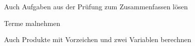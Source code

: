 \begin{kbaufgabe}{Auch Aufgaben aus der Prüfung zum Zusammenfassen lösen}
\begin{kbblock}
\item[]
\end{kbblock}
\end{kbaufgabe}


\begin{kbaufgabe}{Terme malnehmen}
\begin{kbblock}
\end{kbblock}
\begin{kbblock}
\end{kbblock}
\begin{kbblock}
\end{kbblock}
\begin{kbblock}
\end{kbblock}
\begin{kbblock}
\end{kbblock}
\end{kbaufgabe}


\begin{kbaufgabe}{Auch Produkte mit Vorzeichen und zwei Variablen berechnen}
\begin{kbblock}
\end{kbblock}
\end{kbaufgabe}


